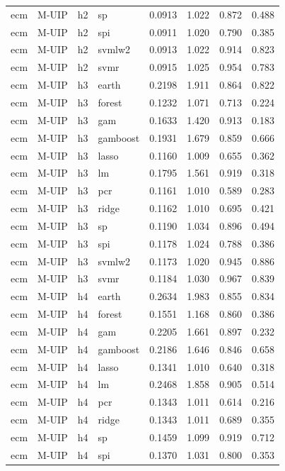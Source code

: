 \begin{ThreePartTable}
\begin{longtable}[t]{llclcccc}
ecm & M-UIP & h2 & sp & 0.0913 & 1.022 & 0.872 & 0.488\\
ecm & M-UIP & h2 & spi & 0.0911 & 1.020 & 0.790 & 0.385\\
ecm & M-UIP & h2 & svmlw2 & 0.0913 & 1.022 & 0.914 & 0.823\\
ecm & M-UIP & h2 & svmr & 0.0915 & 1.025 & 0.954 & 0.783\\
\addlinespace
ecm & M-UIP & h3 & earth & 0.2198 & 1.911 & 0.864 & 0.822\\
ecm & M-UIP & h3 & forest & 0.1232 & 1.071 & 0.713 & 0.224\\
ecm & M-UIP & h3 & gam & 0.1633 & 1.420 & 0.913 & 0.183\\
ecm & M-UIP & h3 & gamboost & 0.1931 & 1.679 & 0.859 & 0.666\\
ecm & M-UIP & h3 & lasso & 0.1160 & 1.009 & 0.655 & 0.362\\
ecm & M-UIP & h3 & lm & 0.1795 & 1.561 & 0.919 & 0.318\\
ecm & M-UIP & h3 & pcr & 0.1161 & 1.010 & 0.589 & 0.283\\
ecm & M-UIP & h3 & ridge & 0.1162 & 1.010 & 0.695 & 0.421\\
ecm & M-UIP & h3 & sp & 0.1190 & 1.034 & 0.896 & 0.494\\
ecm & M-UIP & h3 & spi & 0.1178 & 1.024 & 0.788 & 0.386\\
ecm & M-UIP & h3 & svmlw2 & 0.1173 & 1.020 & 0.945 & 0.886\\
ecm & M-UIP & h3 & svmr & 0.1184 & 1.030 & 0.967 & 0.839\\
\addlinespace
ecm & M-UIP & h4 & earth & 0.2634 & 1.983 & 0.855 & 0.834\\
ecm & M-UIP & h4 & forest & 0.1551 & 1.168 & 0.860 & 0.386\\
ecm & M-UIP & h4 & gam & 0.2205 & 1.661 & 0.897 & 0.232\\
ecm & M-UIP & h4 & gamboost & 0.2186 & 1.646 & 0.846 & 0.658\\
ecm & M-UIP & h4 & lasso & 0.1341 & 1.010 & 0.640 & 0.318\\
ecm & M-UIP & h4 & lm & 0.2468 & 1.858 & 0.905 & 0.514\\
ecm & M-UIP & h4 & pcr & 0.1343 & 1.011 & 0.614 & 0.216\\
ecm & M-UIP & h4 & ridge & 0.1343 & 1.011 & 0.689 & 0.355\\
ecm & M-UIP & h4 & sp & 0.1459 & 1.099 & 0.919 & 0.712\\
ecm & M-UIP & h4 & spi & 0.1370 & 1.031 & 0.800 & 0.353\\

\end{longtable}
\end{ThreePartTable}
